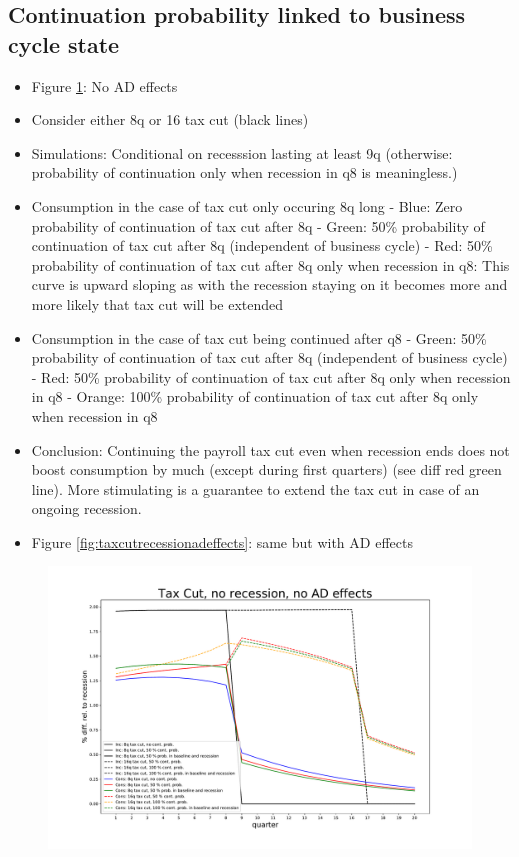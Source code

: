 \documentclass[]{article}
\begin{document}
\FloatBarrier
\subsection{Continuation probability linked to business cycle state}
\begin{itemize}
	\item Figure \ref{fig:taxcutrecessionnoadeffects}: No AD effects
	\item Consider either 8q or 16 tax cut (black lines)
	\item Simulations: Conditional on recesssion lasting at least 9q (otherwise: probability of continuation only when recession in q8 is meaningless.)
	\item Consumption in the case of tax cut only occuring 8q long
	\subitem - Blue:  Zero probability of continuation of tax cut after 8q
	\subitem - Green: 50\% probability of continuation of tax cut after 8q (independent of business cycle)
	\subitem - Red:   50\% probability of continuation of tax cut after 8q only when recession in q8: This curve is upward sloping as with the recession staying on it becomes more and more likely that tax cut will be extended
	\item Consumption in the case of tax cut being continued after q8
	\subitem - Green:  50\% probability of continuation of tax cut after 8q (independent of business cycle)
	\subitem - Red:    50\% probability of continuation of tax cut after 8q only when recession in q8
	\subitem - Orange: 100\% probability of continuation of tax cut after 8q only when recession in q8
	\item Conclusion: Continuing the payroll tax cut even when recession ends does not boost consumption by much (except during first quarters) (see diff red green line). More stimulating is a guarantee to extend the tax cut in case of an ongoing recession.
	\item Figure \ref{fig:taxcutrecessionadeffects}: same but with AD effects
\end{itemize}
	
\begin{figure}
	\includegraphics[width=1\linewidth]{../Continuation_Prob_Experiments/tax_cut_recession_no_AD_effects}
	\caption{}
	\label{fig:taxcutrecessionnoadeffects}
\end{figure}
	
\end{document}
